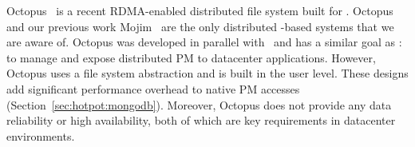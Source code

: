 Octopus~\cite{Octopus} is a recent RDMA-enabled distributed file system built for \nvm.
Octopus and our previous work Mojim~\cite{Zhang15-Mojim} are the only distributed \nvm-based systems that we are aware of.
Octopus was developed in parallel with \hotpot\ and has a similar goal as \hotpot: 
to manage and expose distributed PM to datacenter applications. 
However, Octopus uses a file system abstraction and is built in the user level.
These designs add significant performance overhead to native PM accesses (Section~\ref{sec:hotpot:mongodb}).
Moreover, Octopus does not provide any data reliability or high availability, 
both of which are key requirements in datacenter environments.
